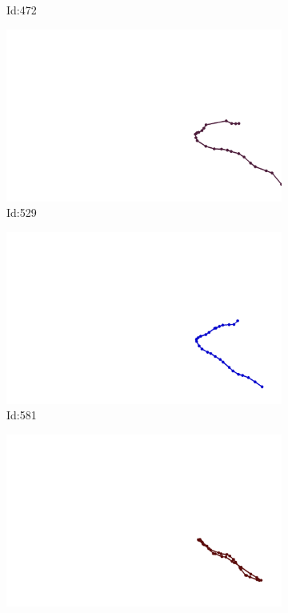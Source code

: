 \documentclass[12pt,twoside]{report}
\begin{document}
\begin{figure}
\begin{subfigure}[b]{0.20\textwidth}
\caption{Id:472}
\end{subfigure}
\begin{subfigure}[b]{0.20\textwidth}
\centering
\includegraphics[width=\textwidth]{../../trajectories/529.png}
\caption{Id:529}
\end{subfigure}
\begin{subfigure}[b]{0.20\textwidth}
\centering
\includegraphics[width=\textwidth]{../../trajectories/581.png}
\caption{Id:581}
\end{subfigure}
\begin{subfigure}[b]{0.20\textwidth}
\centering
\includegraphics[width=\textwidth]{../../trajectories/645.png}

\end{subfigure}
\end{figure}
\end{document}
